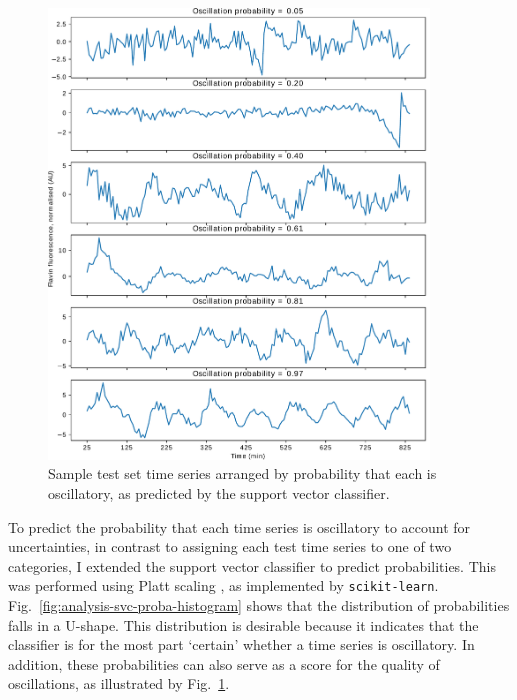 \begin{figure}
  \centering
  \includegraphics[width=0.9\textwidth]{svm_3_edit.pdf}

  \caption{
    Sample test set time series arranged by probability that each is oscillatory, as predicted by the support vector classifier.
  }
  \label{fig:analysis-svc-proba-gallery}
\end{figure}

To predict the probability that each time series is oscillatory to account for uncertainties, in contrast to assigning each test time series to one of two categories, I extended the support vector classifier to predict probabilities.
This was performed using Platt scaling \parencite{plattProbabilisticOutputsSupport1999}, as implemented by \texttt{scikit-learn}.
Fig.\ \ref{fig:analysis-svc-proba-histogram} shows that the distribution of probabilities falls in a U-shape.
This distribution is desirable because it indicates that the classifier is for the most part `certain' whether a time series is oscillatory.
In addition, these probabilities can also serve as a score for the quality of oscillations, as illustrated by Fig.\ \ref{fig:analysis-svc-proba-gallery}.


